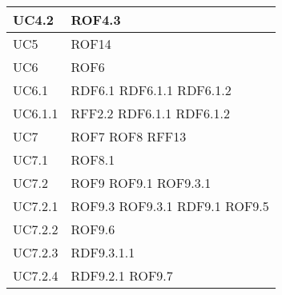 \documentclass[../AnalisideiRequisiti.tex]{subfiles}
\begin{document}
\begin{longtable}{| p{4cm} | p{4cm} |}
		\hline
		\newline UC4.2 &  \newline ROF4.3 \\[1em]
		\hline
		\newline UC5 &  \newline ROF14 \\[1em]
		\hline
		\newline UC6 &  \newline ROF6 \\[1em]
		\hline
		\newline UC6.1 &  \newline RDF6.1 \newline RDF6.1.1 \newline RDF6.1.2 \\[1em]
		\hline
		\newline UC6.1.1 &  \newline RFF2.2 \newline RDF6.1.1 \newline RDF6.1.2 \\[1em]
		\hline
		\newline UC7 &  \newline ROF7 \newline ROF8 \newline RFF13 \\[1em]
		\hline
		\newline UC7.1 &  \newline ROF8.1 \\[1em]
		\hline
		\newline UC7.2 &  \newline ROF9 \newline ROF9.1 \newline ROF9.3.1 \\[1em]
		\hline
		\newline UC7.2.1 &  \newline ROF9.3 \newline ROF9.3.1 \newline RDF9.1 \newline ROF9.5 \\[1em]
		\hline
		\newline UC7.2.2 &  \newline ROF9.6 \\[1em]
		\hline
		\newline UC7.2.3 &  \newline RDF9.3.1.1 \\[1em]
		\hline
		\newline UC7.2.4 &  \newline RDF9.2.1 \newline ROF9.7 \\[1em]

\end{longtable}
\end{document}

